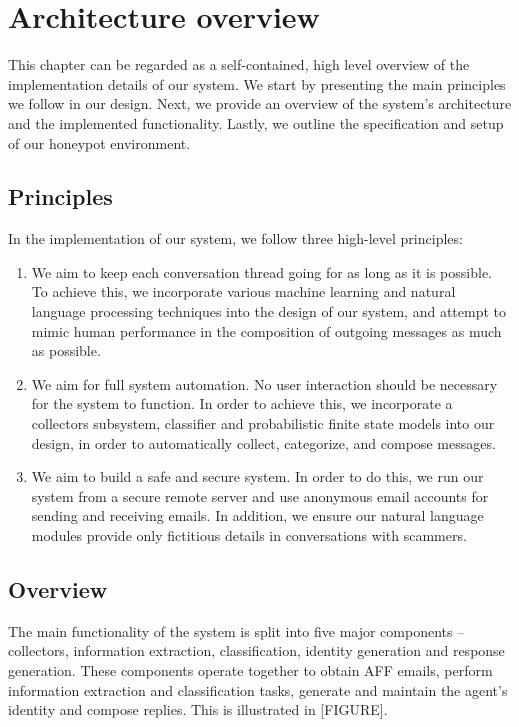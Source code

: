 \chapter{Architecture overview}
This chapter can be regarded as a self-contained, high level overview of the implementation details of our system. We start by presenting the main principles we follow in our design. Next, we provide an overview of the system's architecture and the implemented functionality. Lastly, we outline the specification and setup of our honeypot environment.

\section{Principles}
In the implementation of our system, we follow three high-level principles:

\begin{enumerate}
\item We aim to keep each conversation thread going for as long as it is possible. To achieve this, we incorporate various machine learning and natural language processing techniques into the design of our system, and attempt to mimic human performance in the composition of outgoing messages as much as possible.
\item We aim for full system automation. No user interaction should be necessary for the system to function. In order to achieve this, we incorporate a collectors subsystem, classifier and probabilistic finite state models into our design, in order to automatically collect, categorize, and compose messages.
\item We aim to build a safe and secure system. In order to do this, we run our system from a secure remote server and use anonymous email accounts for sending and receiving emails. In addition, we ensure our natural language modules provide only fictitious details in conversations with scammers.
\end{enumerate}

\section{Overview}
The main functionality of the system is split into five major components – collectors, information extraction, classification, identity generation and response generation. These components operate together to obtain AFF emails, perform information extraction and classification tasks, generate and maintain the agent's identity and compose replies. This is illustrated in [FIGURE].

